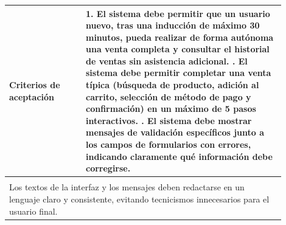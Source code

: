 \begin{longtable}{|p{0.25\linewidth}|p{0.15\linewidth}|p{0.15\linewidth}|p{0.35\linewidth}|}
		\cellcolor{tableheaderblue}\textbf{Criterios de aceptación} & \multicolumn{3}{p{0.70\linewidth}|}{                                                                                                                 %
			1. El sistema debe permitir que un usuario nuevo, tras una inducción de máximo 30 minutos, pueda realizar de forma autónoma una venta completa y consultar el historial de ventas sin asistencia adicional. \newline
			2. El sistema debe permitir completar una venta típica (búsqueda de producto, adición al carrito, selección de método de pago y confirmación) en un máximo de 5 pasos interactivos. \newline
		3. El sistema debe mostrar mensajes de validación específicos junto a los campos de formularios con errores, indicando claramente qué información debe corregirse.}                                                \\ \hline
		\rowcolor{tableheaderblue}
		\multicolumn{4}{|l|}{\textbf{Restricciones}}                                                                                                                                                                       \\ \hline
		\multicolumn{4}{|p{0.96\linewidth}|}{%
		Los textos de la interfaz y los mensajes deben redactarse en un lenguaje claro y consistente, evitando tecnicismos innecesarios para el usuario final.}                                                            \\ \hline
	
\end{longtable}
\endgroup


